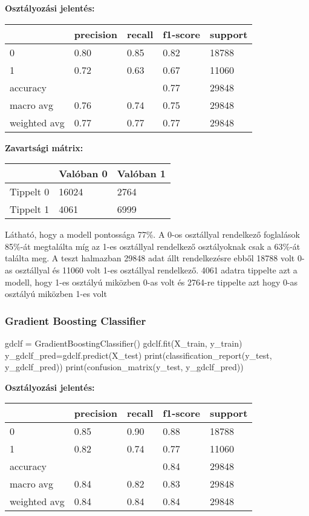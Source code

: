 \textbf{Osztályozási jelentés:}

\begin{tabular}{|l|l|l|l|l|}
\hline
             & precision & recall & f1-score & support \\
             \hline
0            & 0.80      & 0.85   & 0.82     & 18788   \\
\hline
1            & 0.72      & 0.63   & 0.67     & 11060   \\
\hline
accuracy     &           &        & 0.77     & 29848   \\
\hline
macro avg    & 0.76      & 0.74   & 0.75     & 29848   \\
\hline
weighted avg & 0.77      & 0.77   & 0.77     & 29848  \\
\hline
\end{tabular}

\textbf{Zavartsági mátrix:}

\begin{tabular}{|l|l|l|}
\hline
          & Valóban 0 & Valóban 1 \\
          \hline
Tippelt 0 & 16024     & 2764      \\
\hline
Tippelt 1 & 4061      & 6999   \\
\hline
\end{tabular}

Látható, hogy a modell pontossága 77\%. A 0-os osztállyal rendelkező foglalások 85\%-át megtalálta míg az 1-es osztállyal rendelkező osztályoknak csak a 63\%-át találta meg. A teszt halmazban 29848 adat állt rendelkezésre ebből 18788 volt 0-as osztállyal és 11060 volt 1-es osztállyal rendelkező. 4061 adatra tippelte azt a modell, hogy 1-es osztályú miközben 0-as volt és 2764-re tippelte azt hogy 0-as osztályú miközben 1-es volt

\subsubsection{Gradient Boosting Classifier}
\begin{python}
gdclf = GradientBoostingClassifier()
gdclf.fit(X_train, y_train)
y_gdclf_pred=gdclf.predict(X_test)
print(classification_report(y_test, y_gdclf_pred))
print(confusion_matrix(y_test, y_gdclf_pred))
\end{python}

\textbf{Osztályozási jelentés:}

\begin{tabular}{|l|l|l|l|l|}
\hline
             & precision & recall & f1-score & support \\
             \hline
0            & 0.85      & 0.90   & 0.88     & 18788   \\
\hline
1            & 0.82      & 0.74   & 0.77     & 11060   \\
\hline
accuracy     &           &        & 0.84     & 29848   \\
\hline
macro avg    & 0.84      & 0.82   & 0.83     & 29848   \\
\hline
weighted avg & 0.84      & 0.84   & 0.84     & 29848  \\
\hline
\end{tabular}

